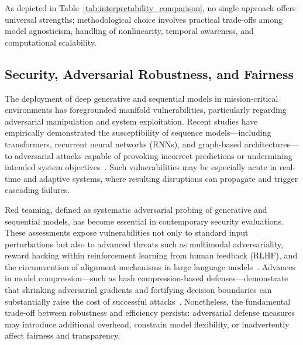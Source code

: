 \documentclass[sigconf]{acmart}
\begin{document}
As depicted in Table~\ref{tab:interpretability_comparison}, no single approach offers universal strengths; methodological choice involves practical trade-offs among model agnosticism, handling of nonlinearity, temporal awareness, and computational scalability.

\subsection{Security, Adversarial Robustness, and Fairness}

The deployment of deep generative and sequential models in mission-critical environments has foregrounded manifold vulnerabilities, particularly regarding adversarial manipulation and system exploitation. Recent studies have empirically demonstrated the susceptibility of sequence models—including transformers, recurrent neural networks (RNNs), and graph-based architectures—to adversarial attacks capable of provoking incorrect predictions or undermining intended system objectives~\cite{ref46}\cite{ref51}\cite{ref69}\cite{ref70}\cite{ref78}. Such vulnerabilities may be especially acute in real-time and adaptive systems, where resulting disruptions can propagate and trigger cascading failures.

Red teaming, defined as systematic adversarial probing of generative and sequential models, has become essential in contemporary security evaluations. These assessments expose vulnerabilities not only to standard input perturbations but also to advanced threats such as multimodal adversariality, reward hacking within reinforcement learning from human feedback (RLHF), and the circumvention of alignment mechanisms in large language models~\cite{ref46}\cite{ref69}\cite{ref78}. Advances in model compression—such as hash compression-based defenses—demonstrate that shrinking adversarial gradients and fortifying decision boundaries can substantially raise the cost of successful attacks~\cite{ref51}. Nonetheless, the fundamental trade-off between robustness and efficiency persists: adversarial defense measures may introduce additional overhead, constrain model flexibility, or inadvertently affect fairness and transparency.
\end{document}
